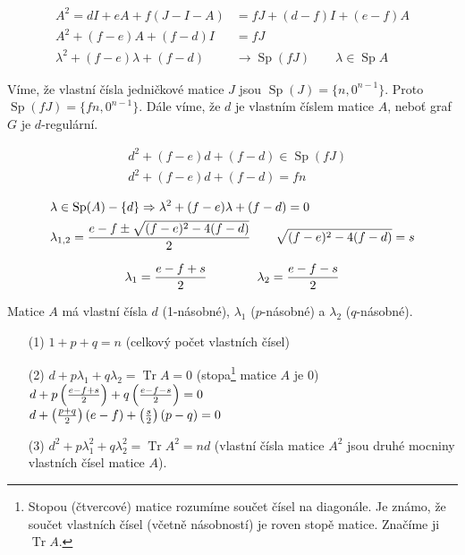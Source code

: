 \documentclass[a4paper,12pt,titlepage]{article}
\DeclareMathOperator{\Sp}{Sp}
\DeclareMathOperator{\Tr}{Tr}
\begin{document}
\begin{align}
	A^2 = dI + eA + f(J-I-A) &= fJ + (d-f)I + (e-f)A \\
	A^2 + (f-e)A + (f-d)I &= fJ \\
	\lambda^2 + (f-e)\lambda + (f-d) &\rightarrow \Sp(fJ)\qquad \lambda\in\Sp A
\end{align}

Víme, že vlastní čísla jedničkové matice $J$ jsou $\Sp(J) = \{n, 0^{n-1}\}$.
Proto $\Sp(fJ) = \{fn, 0^{n-1}\}$. Dále víme, že $d$ je vlastním číslem matice
$A$, neboť graf $G$ je $d$-regulární.

\begin{align}
	&d^2 + (f-e)d + (f-d) \in \Sp(fJ) \\
	&d^2 + (f-e)d + (f-d) = fn \\
\end{align}
\begin{align}
	&\lambda \in \Sp(A) - \{d\} \Rightarrow \lambda^2 + (f-e)\lambda + (f-d) = 0 \\
	&\lambda_{1,2} = {e-f \pm \sqrt{(f-e)^2-4(f-d)} \over 2} \qquad \sqrt{(f-e)^2-4(f-d)} = s
\end{align}

$$\lambda_1 = {e-f+s\over 2}\qquad\qquad \lambda_2 = {e-f-s\over 2}$$

Matice $A$ má vlastní čísla $d$ (1-násobné), $\lambda_1$ ($p$-násobné) a
$\lambda_2$ ($q$-násobné).

\begin{enumerate}
	\item[(1)] $1 + p + q = n$ (celkový počet vlastních čísel)

	\item[(2)] $d + p\lambda_1 + q\lambda_2 = \Tr A = 0$ (stopa\footnote{Stopou (čtvercové) matice rozumíme součet čísel na diagonále. Je známo, že součet vlastních čísel (včetně násobností) je roven stopě matice. Značíme ji $\Tr A$.} matice $A$ je 0) \\
	$d + p\left({e-f+s\over 2}\right) + q\left({e-f-s\over 2}\right) = 0$ \\
	$d + \left({p+q\over 2}\right)(e-f) + \left({s\over 2}\right)(p-q) = 0$

	\item[(3)] $d^2 + p\lambda_1^2 + q\lambda_2^2 = \Tr A^2 = nd$ (vlastní čísla matice $A^2$ jsou druhé mocniny vlastních čísel matice $A$).
\end{enumerate}
\end{document}
